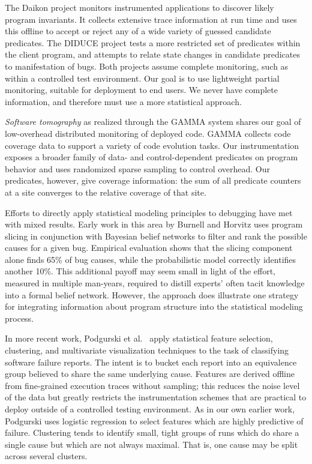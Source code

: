 \documentclass[10pt]{acmconfbig}
\newcommand{\termdef}[1]{\textit{#1}}
\begin{document}
The Daikon project \cite{ernst2001} monitors instrumented applications
to discover likely program invariants.  It collects extensive trace
information at run time and uses this offline to accept or reject any
of a wide variety of guessed candidate predicates.  The DIDUCE project
\cite{ICSE02*291} tests a more restricted set of predicates within the
client program, and attempts to relate state changes in candidate
predicates to manifestation of bugs.  Both projects assume complete
monitoring, such as within a controlled test environment.  Our goal is
to use lightweight partial monitoring, suitable for deployment to end
users.  We never have complete information, and therefore must use a
more statistical approach.

\termdef{Software tomography} as realized through the GAMMA system
\cite{PASTE'02*2,Orso:2003:LFDIART} shares our goal of low-overhead
distributed monitoring of deployed code.  GAMMA collects code coverage
data to support a variety of code evolution tasks.  Our
instrumentation exposes a broader family of data- and
control-dependent predicates on program behavior and uses randomized
sparse sampling to control overhead.  Our
predicates, however, give coverage information: the sum of all predicate counters at a site converges to the relative coverage of that site.

Efforts to directly apply statistical modeling principles to debugging
have met with mixed results.  Early work in this area by Burnell and
Horvitz \cite{Burnell:1995:SCM} uses program slicing in conjunction
with Bayesian belief networks to filter and rank the possible causes
for a given bug.  Empirical evaluation shows that the slicing component
alone finds 65\% of bug causes, while the probabilistic model
correctly identifies another 10\%.  This additional payoff may seem
small in light of the effort, measured in multiple
man-years, required to distill experts' often tacit knowledge into a
formal belief network.  However, the approach does illustrate one
strategy for integrating information about program structure into the
statistical modeling process.

In more recent work, Podgurski et al.\ \cite{ICSE`03*465} apply
statistical feature selection, clustering, and multivariate
visualization techniques to the task of classifying software failure
reports.  The intent is to bucket each report into an equivalence
group believed to share the same underlying cause.  Features are
derived offline from fine-grained execution traces without sampling;
this reduces the noise level of the data but greatly restricts the
instrumentation schemes that are practical to deploy outside of a
controlled testing environment.  As in our own earlier work, Podgurski
uses logistic regression to select features which are highly
predictive of failure.  
Clustering tends to identify small, tight groups of runs which do
share a single cause but which are not always maximal.  That is, one
cause may be split across several clusters.
\end{document}

